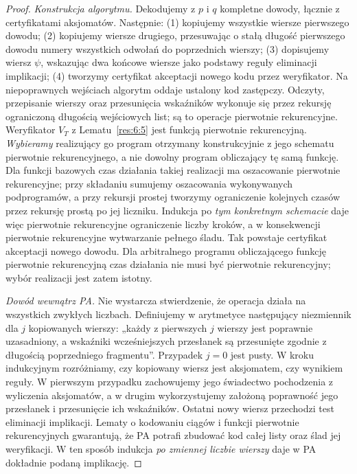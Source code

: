 \begin{proof}
\emph{Konstrukcja algorytmu.} Dekodujemy z $p$ i $q$
kompletne dowody, łącznie z certyfikatami aksjomatów.
Następnie: (1) kopiujemy wszystkie wiersze pierwszego
dowodu; (2) kopiujemy wiersze drugiego, przesuwając
o stałą długość pierwszego dowodu numery wszystkich
odwołań do poprzednich wierszy; (3) dopisujemy
wiersz $\psi$, wskazując dwa końcowe wiersze jako
podstawy reguły eliminacji implikacji; (4) tworzymy
certyfikat akceptacji nowego kodu przez weryfikator.
Na niepoprawnych wejściach algorytm oddaje ustalony
kod zastępczy. Odczyty, przepisanie wierszy oraz
przesunięcia wskaźników wykonuje się przez rekursję
ograniczoną długością wejściowych list; są to operacje
pierwotnie rekurencyjne. Weryfikator $V_T$ z Lematu~\ref{res:6:5} jest
funkcją pierwotnie rekurencyjną. \emph{Wybieramy}
realizujący go program otrzymany konstrukcyjnie z jego
schematu pierwotnie rekurencyjnego, a nie dowolny
program obliczający tę samą funkcję. Dla funkcji
bazowych czas działania takiej realizacji ma oszacowanie
pierwotnie rekurencyjne; przy składaniu sumujemy
oszacowania wykonywanych podprogramów, a przy rekursji
prostej tworzymy ograniczenie kolejnych czasów przez
rekursję prostą po jej liczniku. Indukcja po \emph{tym
konkretnym schemacie} daje więc pierwotnie rekurencyjne
ograniczenie liczby kroków, a w konsekwencji pierwotnie
rekurencyjne wytwarzanie pełnego śladu. Tak powstaje
certyfikat akceptacji nowego dowodu. Dla arbitralnego
programu obliczającego funkcję pierwotnie rekurencyjną
czas działania nie musi być pierwotnie rekurencyjny;
wybór realizacji jest zatem istotny.

\emph{Dowód wewnątrz PA.} Nie wystarcza stwierdzenie,
że operacja działa na wszystkich zwykłych liczbach.
Definiujemy w arytmetyce następujący niezmiennik
dla $j$ kopiowanych wierszy: „każdy z pierwszych $j$
wierszy jest poprawnie uzasadniony, a wskaźniki
wcześniejszych przesłanek są przesunięte zgodnie
z długością poprzedniego fragmentu”. Przypadek $j=0$
jest pusty. W kroku indukcyjnym rozróżniamy, czy
kopiowany wiersz jest aksjomatem, czy wynikiem
reguły. W pierwszym przypadku zachowujemy
jego świadectwo pochodzenia z wyliczenia aksjomatów,
a w drugim wykorzystujemy założoną poprawność
jego przesłanek i przesunięcie ich wskaźników.
Ostatni nowy wiersz przechodzi test eliminacji implikacji.
Lematy o kodowaniu ciągów i funkcji pierwotnie
rekurencyjnych gwarantują, że PA potrafi zbudować
kod całej listy oraz ślad jej weryfikacji.
W ten sposób indukcja \emph{po zmiennej liczbie
wierszy} daje w PA dokładnie podaną implikację.
\end{proof}

